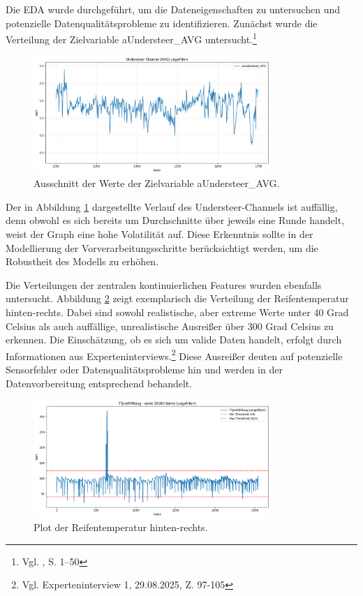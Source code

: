 Die \ac{EDA} wurde durchgeführt, um die Dateneigenschaften zu untersuchen und potenzielle Datenqualitätsprobleme zu identifizieren. Zunächst wurde die Verteilung der Zielvariable aUndersteer\_AVG untersucht.\footnote{Vgl. \cite{Tukey1977}, S. 1–50}
\begin{figure}[H]
  \centering
  \includegraphics[width=0.8\textwidth]{graphics/understeer_nonfilt.png}
  \caption{Ausschnitt der Werte der Zielvariable aUndersteer\_AVG.}
  \label{fig:understeer_distribution}
\end{figure}
Der in Abbildung \ref{fig:understeer_distribution} dargestellte Verlauf des Understeer-Channels ist auffällig, denn obwohl es sich bereits um Durchschnitte über jeweils eine Runde handelt, weist der Graph eine hohe Volatilität auf.
Diese Erkenntnis sollte in der Modellierung der Vorverarbeitungsschritte berücksichtigt werden, um die Robustheit des Modells zu erhöhen.

Die Verteilungen der zentralen kontinuierlichen Features wurden ebenfalls untersucht. Abbildung \ref{fig:temp_distribution} zeigt exemplarisch die Verteilung der Reifentemperatur hinten-rechts. Dabei sind sowohl realistische, aber extreme Werte unter 40 Grad Celsius als auch auffällige, unrealistische Ausreißer über 300 Grad Celsius zu erkennen. Die Einschätzung, ob es sich um valide Daten handelt, erfolgt durch Informationen aus Experteninterviews.\footnote{Vgl. Experteninterview 1, 29.08.2025, Z. 97-105} Diese Ausreißer deuten auf potenzielle Sensorfehler oder Datenqualitätsprobleme hin und werden in der Datenvorbereitung entsprechend behandelt.
\begin{figure}[H]
  \centering
  \includegraphics[width=0.8\textwidth]{graphics/TempPlot.png}
  \caption{Plot der Reifentemperatur hinten-rechts.}
  \label{fig:temp_distribution}
\end{figure}

